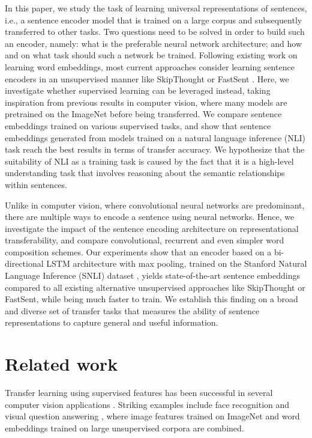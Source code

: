 \documentclass[11pt,letterpaper]{article}
\begin{document}
In this paper, we study the task of learning universal representations of sentences, i.e., a sentence encoder model that is trained on a large corpus and subsequently transferred to other tasks.
Two questions need to be solved in order to build such an encoder, namely: what is the preferable neural network architecture; and how and on what task should such a network be trained.
Following existing work on learning word embeddings, most current approaches consider learning sentence encoders in an unsupervised manner like SkipThought \cite{kiros2015skip} or FastSent \cite{hill2016learning}. Here, we investigate whether supervised learning can be leveraged instead, taking inspiration from previous results in computer vision, where many models are pretrained on the ImageNet \cite{deng2009imagenet} before being transferred.
We compare sentence embeddings trained on various supervised tasks, and show that sentence embeddings generated from models trained on a natural language inference (NLI) task reach the best results in terms of transfer accuracy.
We hypothesize that the suitability of NLI as a training task is caused by the fact that it is a high-level understanding task that involves reasoning about the semantic relationships within sentences. 


Unlike in computer vision, where convolutional neural networks are predominant, there are multiple ways to encode a sentence using neural networks. Hence, we investigate the impact of the sentence encoding architecture on representational transferability, and compare convolutional, recurrent and even simpler word composition schemes.
Our experiments show that an encoder based on a bi-directional LSTM architecture with max pooling, trained on the Stanford Natural Language Inference (SNLI) dataset \cite{bowman2015large}, yields state-of-the-art sentence embeddings compared to all existing alternative unsupervised approaches like SkipThought or FastSent, while being much faster to train. We establish this finding on a broad and diverse set of transfer tasks that measures the ability of sentence representations to capture general and useful information.


\section{Related work}
Transfer learning using supervised features has been successful in several computer vision applications \cite{razavian2014cvpr}. Striking examples include face recognition \cite{taigman2014deepface} and visual question answering \cite{antol2015vqa}, where image features trained on ImageNet \cite{deng2009imagenet} and word embeddings trained on large unsupervised corpora are combined. 
\end{document}
